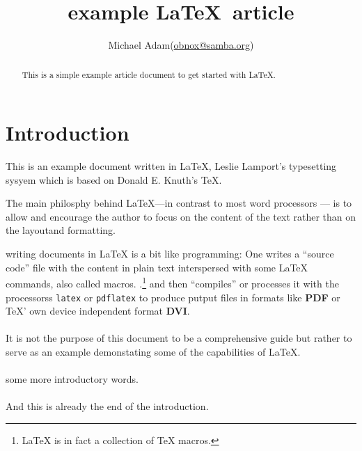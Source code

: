 \documentclass{article}
\title{example \LaTeX\ article}
\author{Michael Adam(\href{mailto:obnox@samba.org}{obnox@samba.org})}
\begin{document}
\maketitle

\begin{abstract}

    This is a simple  example article document to get started with  {\LaTeX}.

\end{abstract}

\tableofcontents

\section*{Introduction}

This is an example document written in {\LaTeX}, Leslie Lamport's typesetting
sysyem which is based on Donald E. Knuth's {\TeX}.

The main philosphy behind {\LaTeX}---in contrast to most word processors --- is to allow and encourage the author to
focus on the content of the text rather than on the layoutand formatting.

writing documents in {\LaTeX} is a bit like programming: One writes a ``source code''  file with the content in plain text
interspersed with some {\LaTeX} commands, also called macros. .\footnote{{\LaTeX} is in fact a collection of {\TeX} macros.}\label{fn:macros}
and then ``compiles'' or processes it with the processorss \verb|latex| or \verb|pdflatex| to produce
putput files in formats like \textbf{PDF} or {\TeX}' own device independent format \textbf{DVI}.

\paragraph{} It is not the purpose of this document to be a comprehensive guide but rather to serve as an example demonstating some of the capabilities of  {\LaTeX}.


\paragraph{} some more introductory words.

\paragraph{} And this is already the end of the introduction.
\end{document}
